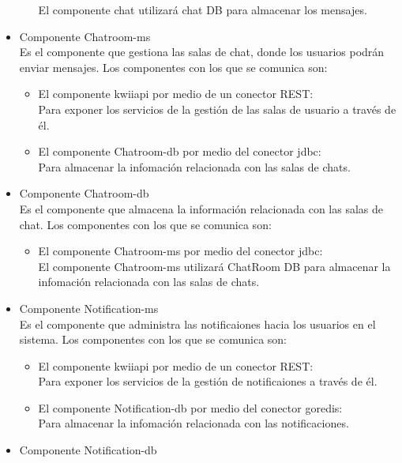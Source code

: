 \begin{itemize}
\begin{itemize}
        El componente chat utilizará chat DB  para almacenar los mensajes.
    \end{itemize}
    \item Componente Chatroom-ms\\
    Es el componente que gestiona las salas de chat, donde los usuarios podrán enviar mensajes.
    Los componentes con los que se comunica son:
    \begin{itemize}
        \item El componente kwii\textunderscore api por medio de un conector REST:\\
        Para exponer los servicios de la gestión de las salas de usuario a través de él.
        \item El componente Chatroom-db por medio del conector jdbc:\\
        Para almacenar la infomación relacionada con las salas de chats.
    \end{itemize}
    \item Componente Chatroom-db\\
    Es el componente que almacena la información relacionada con las salas de chat.
    Los componentes con los que se comunica son:
    \begin{itemize}
        \item El componente Chatroom-ms por medio del conector jdbc:\\
        El componente Chatroom-ms utilizará ChatRoom DB para almacenar la infomación relacionada con las salas de chats.
    \end{itemize}
    \item Componente Notification-ms\\
    Es el componente que administra las notificaiones hacia los usuarios en el sistema.
    Los componentes con los que se comunica son:
    \begin{itemize}
        \item El componente kwii\textunderscore api por medio de un conector REST:\\
        Para exponer los servicios de la gestión de notificaiones a través de él.
        \item El componente Notification-db por medio del conector go\textunderscore redis:\\
        Para almacenar la infomación relacionada con las notificaciones.
    \end{itemize}
    \item Componente Notification-db\\

\end{itemize}
